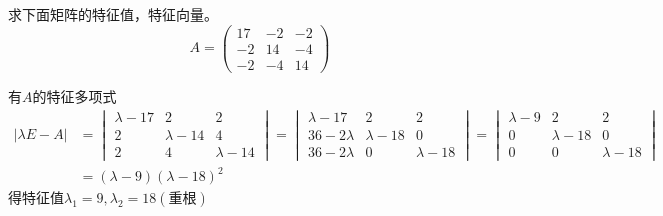 \begin{example}
    求下面矩阵的特征值，特征向量。
    \[
        A =
        \begin{pmatrix}
            17 & -2 & -2 \\
            -2 & 14 & -4 \\
            -2 & -4 & 14
        \end{pmatrix}
    \]
\end{example}
\begin{solution}
    有$A$的特征多项式
    \begin{align*}
        |\lambda E - A| & =
        \begin{vmatrix}
            \lambda-17 & 2            & 2           \\
            2          & \lambda - 14 & 4           \\
            2          & 4            & \lambda -14
        \end{vmatrix}
        =
        \begin{vmatrix}
            \lambda-17  & 2            & 2           \\
            36-2\lambda & \lambda - 18 & 0           \\
            36-2\lambda & 0            & \lambda -18
        \end{vmatrix}
        =
        \begin{vmatrix}
            \lambda-9 & 2            & 2           \\
            0         & \lambda - 18 & 0           \\
            0         & 0            & \lambda -18
        \end{vmatrix}                    \\
                        & = (\lambda-9)(\lambda-18)^2
    \end{align*}
    得特征值$\lambda_1 = 9, \lambda_2 = 18(\text{重根})$


\end{solution}

